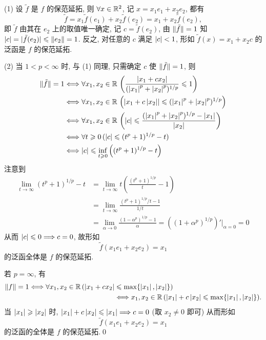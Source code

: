 	\begin{Proof}
		(1) 设 $ \tilde{f} $ 是 $ f $ 的保范延拓, 则 $ \forall x\in\mathbb{R}^{2} $, 记 $ x=x_{1}e_{1}+x_{2}e_{2} $, 都有
		\[
			\tilde{f} = x_{1}\tilde{f}(e_{1})+x_{2}\tilde{f}(e_{2})=x_{1}+x_{2}\tilde{f}(e_{2}),
		\]
		即 $ \tilde{f} $ 由其在 $ e_{2} $ 上的取值唯一确定, 记 $ c=\tilde{f}(e_{2}) $, 由 $ \lVert \tilde{f}\rVert=1 $ 知 $ \left| c \right| =\lvert \tilde{f}(e_{2})\rvert\leqslant\left\| e_{2} \right\|=1 $. 反之, 对任意的 $ c $ 满足 $ \left| c \right| <1 $, 形如 $ \tilde{f}(x)=x_{1}+x_{2}c $ 的泛函是 $ f $ 的保范延拓.

		(2) 当 $ 1<p<\infty $ 时, 与 (1) 同理, 只需确定 $ c $ 使 $ \lVert \tilde{f}\rVert=1 $, 则
		\[
			\begin{aligned}
				\lVert \tilde{f}\rVert=1 & \Longleftrightarrow \forall x_{1}, x_{2}\in\mathbb{R}\,\left( \frac{\left| x_{1}+cx_{2} \right| }{(\left| x_{1} \right| ^{p}+\left| x_{2} \right| ^{p})^{1/p}}\leqslant1 \right)\\
				& \Longleftrightarrow\forall x_{1}, x_{2}\in\mathbb{R}\,\left(\left| x_{1}+c\left| x_{2} \right|  \right| \leqslant(\left| x_{1} \right| ^{p}+\left| x_{2} \right| ^{p})^{1/p} \right)\\
				& \Longleftrightarrow \forall x_{1}, x_{2}\in\mathbb{R}\,\left( \left| c \right| \leqslant\frac{(\left| x_{1} \right| ^{p}+\left| x_{2} \right| ^{p})^{1/p}-\left| x_{1} \right| }{\left| x_{2} \right| } \right)\\
				& \Longleftrightarrow \forall t\geqslant0\,(\left| c \right| \leqslant(t^{p}+1)^{1/p}-t)\\
				&\Longleftrightarrow \left| c \right| \leqslant\inf_{t\geqslant0}\left( (t^{p}+1)^{1/p}-t \right)
			\end{aligned}
		\]
		注意到
		\[
			\begin{aligned}
				\lim_{t\to\infty}(t^{p}+1)^{1/p}-t & =\lim_{t\to\infty}t\left( \frac{(t^{p}+1)^{1/p}}{t}-1 \right)\\
				& = \lim_{t\to\infty}\frac{(t^{p}+1)^{1/p}/t-1}{1/t}\\
				& = \lim_{\alpha\to0}\frac{(1-\alpha^{p})^{1/p}-1}{\alpha}=\left( (1+\alpha^{p})^{1/p} \right)'\Big|_{\alpha=0}=0
			\end{aligned}
		\]
		从而 $ \left| c \right| \leqslant0\Longrightarrow c=0 $, 故形如 
		\[
			\tilde{f}(x_{1}e_{1}+x_{2}e_{2})=x_{1}
		\]
		的泛函全体是 $ f $ 的保范延拓.

		若 $ p=\infty $, 有
		\[
			\begin{aligned}
				\lVert f\rVert=1\Longleftrightarrow \forall x_{1}, x_{2}\in\mathbb{R}\,(\left| x_{1}+cx_{2} \right| & \leqslant\max\{ \left| x_{1} \right| , \left| x_{2} \right|  \})\\
				& \Longleftrightarrow x_{1}, x_{2}\in\mathbb{R}\,(\left| x_{1} \right| +c\left| x_{2} \right| \leqslant\max\{ \left| x_{1} \right| , \left| x_{2} \right|  \}).
			\end{aligned}	
		\]
		当 $ \left| x_{1} \right| \geqslant\left| x_{2} \right|  $ 时, $ \left| x_{1} \right| +c\left| x_{2} \right| \leqslant\left| x_{1} \right| \Longrightarrow c=0 $ (取 $ x_{2}\ne 0 $ 即可) 从而形如
		\[
			\tilde{f}(x_{1}e_{1}+x_{2}e_{2})=x_{1}
		\]
		的泛函的全体是 $ f $ 的保范延拓.\qed
	\end{Proof}

